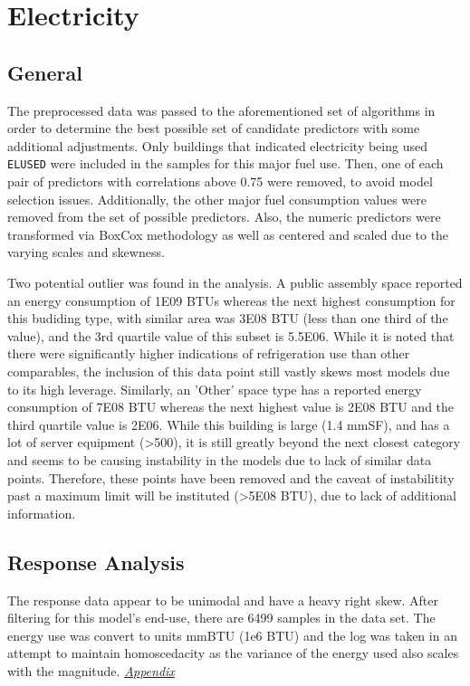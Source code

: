 \section*{Electricity}
\label{sec:electricity}

\subsection{General}

The preprocessed data was passed to the aforementioned set of algorithms in order to determine the best possible set of candidate predictors with some additional adjustments.  Only buildings that indicated electricity being used \lstinline{ELUSED} were included in the samples for this major fuel use.  Then, one of each pair of predictors with correlations above 0.75 were removed, to avoid model selection issues. Additionally, the other major fuel consumption values were removed from the set of possible predictors.  Also, the numeric predictors were transformed via BoxCox methodology as well as centered and scaled due to the varying scales and skewness.

Two potential outlier was found in the analysis. A public assembly space reported an energy consumption of 1E09 BTUs whereas the next highest consumption for this budiding type, with similar area was 3E08 BTU (less than one third of the value), and the 3rd quartile value of this subset is 5.5E06.  While it is noted that there were significantly higher indications of refrigeration use than other comparables, the inclusion of this data point still vastly skews most models due to its high leverage.  Similarly, an 'Other' space type has a reported energy consumption of 7E08 BTU whereas the next highest value is 2E08 BTU and the third quartile value is 2E06.  While this building is large (1.4 mmSF), and has a lot of server equipment (>500), it is still greatly beyond the next closest category and seems to be causing instability in the models due to lack of similar data points.  Therefore, these points have been removed and the caveat of instabilitity past a maximum limit will be instituted (>5E08 BTU), due to lack of additional information.

\subsection{Response Analysis}

The response data appear to be unimodal and have a heavy right skew.  After filtering for this model's end-use, there are 6499 samples in the data set.  The energy use was convert to units mmBTU (1e6 BTU) and the log was taken in an attempt to maintain homoscedacity as the variance of the energy used also scales with the magnitude.  \textit{\hyperref[appendix:electricity:response]{Appendix}}


